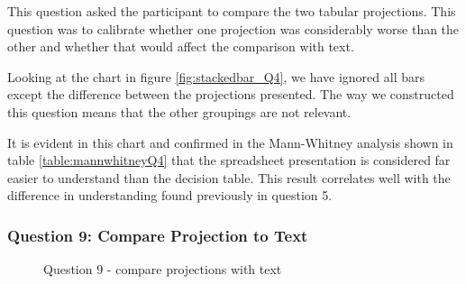 This question asked the participant to compare the two tabular projections.  
This question was to calibrate whether one projection was considerably worse than the other and whether that would affect the comparison with text.

Looking at the chart in figure \ref{fig:stackedbar_Q4}, we have ignored all bars except the difference between the projections presented.
The way we constructed this question means that the other groupings are not relevant.

It is evident in this chart and confirmed in the Mann-Whitney analysis shown in table \ref{table:mannwhitneyQ4} that the spreadsheet presentation is considered far easier to understand than the decision table.
This result correlates well with the difference in understanding found previously in question 5.


\subsubsection{Question 9: Compare Projection to Text}

\begin{figure}
    \centering
    \caption{Question 9 - compare projections with text}
    \label{fig:stackedbar_Q5}
\end{figure}

